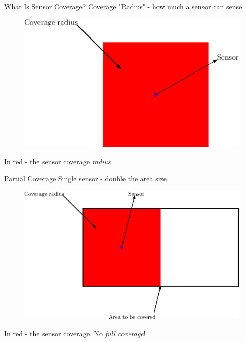 \documentclass[t]{beamer}
\begin{document}
\begin{frame}[label=motivation3]{What Is Sensor Coverage?}
Coverage "Radius" - how much a sensor can sense

\begin{figure}[b]
\includegraphics[scale=0.5]{motivation/coverage-radius.eps}
\end{figure}

In red - the sensor coverage \emph{radius}
\end{frame}
\begin{frame}[label=motivation4]{Partial Coverage}
Single sensor - double the area size

\begin{figure}[b]
\includegraphics[scale=0.5]{motivation/partial-coverage.eps}
\end{figure}
In red - the sensor coverage. No \emph{full coverage}!
\end{frame}
\end{document}
